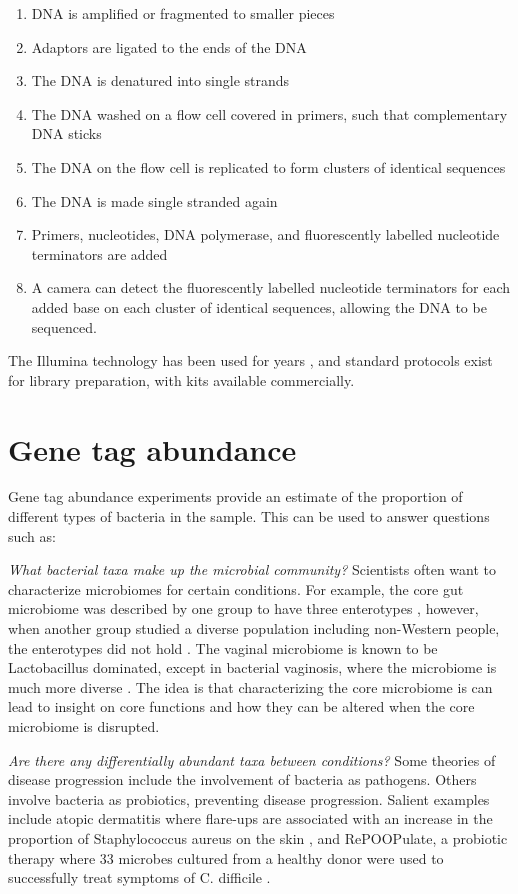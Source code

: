 \begin{enumerate}
\item DNA is amplified or fragmented to smaller pieces
\item Adaptors are ligated to the ends of the DNA
\item The DNA is denatured into single strands
\item The DNA washed on a flow cell covered in primers, such that complementary DNA sticks
\item The DNA on the flow cell is replicated to form clusters of identical sequences
\item The DNA is made single stranded again
\item Primers, nucleotides, DNA polymerase, and fluorescently labelled nucleotide terminators are added
\item A camera can detect the fluorescently labelled nucleotide terminators for each added base on each cluster of identical sequences, allowing the DNA to be sequenced.
\end{enumerate}

The Illumina technology has been used for years \cite{bentley2008accurate}, and standard protocols exist for library preparation, with kits available commercially.

\section{Gene tag abundance}
Gene tag abundance experiments provide an estimate of the proportion of different types of bacteria in the sample. This can be used to answer questions such as:

\textit{What bacterial taxa make up the microbial community?}
Scientists often want to characterize microbiomes for certain conditions. For example, the core gut microbiome was described by one group to have three enterotypes \cite{arumugam2011enterotypes}, however, when another group studied a diverse population including non-Western people, the enterotypes did not hold \cite{yatsunenko2012human}. The vaginal microbiome is known to be Lactobacillus dominated, except in bacterial vaginosis, where the microbiome is much more diverse \cite{hummelen2010deep}. The idea is that characterizing the core microbiome is can lead to insight on core functions and how they can be altered when the core microbiome is disrupted.

\textit{Are there any differentially abundant taxa between conditions?}
Some theories of disease progression include the involvement of bacteria as pathogens. Others involve bacteria as probiotics, preventing disease progression. Salient examples include atopic dermatitis where flare-ups are associated with an increase in the proportion of Staphylococcus aureus on the skin \cite{kong2012temporal}, and RePOOPulate, a probiotic therapy where 33 microbes cultured from a healthy donor were used to successfully treat symptoms of C. difficile \cite{petrof2013stool}.

